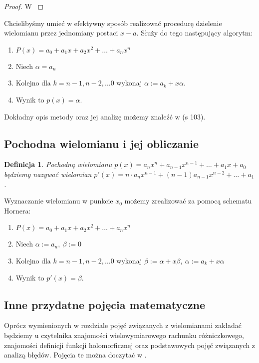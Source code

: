 \documentclass{article}
\newtheorem{definicja}{Definicja}
\begin{document}
\begin{proof}
W \cite{kostrikin}	
\end{proof}

Chcielibyśmy umieć w efektywny sposób realizować procedurę dzielenie wielomianu przez jednomiany postaci $x-a$. Służy do tego następujący algorytm:

\begin{enumerate}
\item $P(x) = a_0 + a_1 x + a_2 x^2 + \ldots + a_n x^n$
\item Niech $\alpha = a_n$
\item Kolejno dla $k = n-1, n-2, \ldots 0$ wykonaj $\alpha := a_k + x \alpha$.
\item Wynik to $p(x) = \alpha$.
\end{enumerate}

Dokładny opis metody oraz jej analizę możemy znaleźć w \cite{kincaid} (s 103).\\

\subsection{Pochodna wielomianu i jej obliczanie}

\begin{definicja}
Pochodną wielomianu $p(x) = a_nx^n + a_{n-1}x^{n-1} + \ldots + a_1x + a_0$ będziemy nazywać wielomian $p'(x) = 	n \cdot a_n x^{n-1} + (n-1) a_{n-1}x^{n-2} + \ldots +  a_1$.
\end{definicja}

Wyznaczanie wielomianu w punkcie $x_0$ możemy zrealizować za pomocą schematu Hornera:

\begin{enumerate}
\item $P(x) = a_0 + a_1 x + a_2 x^2 + \ldots + a_n x^n$
\item Niech $\alpha := a_n, \ \beta := 0$
\item Kolejno dla $k = n-1, n-2, \ldots 0$ wykonaj $\beta := \alpha + x \beta, \ \alpha := a_k + x \alpha$

\item Wynik to $p'(x) = \beta$.
\end{enumerate}

\subsection{Inne przydatne pojęcia matematyczne}

Oprócz wymienionych w rozdziale pojęć związanych z wielomianami zakładać będziemy u czytelnika znajomości wielowymiarowego rachunku różniczkowego, znajomości definicji funkcji holomorficznej oraz podstawowych pojęć związanych z analizą błędów. Pojęcia te można doczytać w \cite{leja}. 
\end{document}
